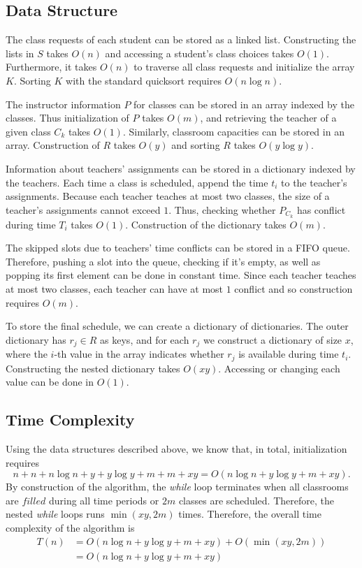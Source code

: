 \documentclass[11pt, oneside]{article}   	%
\begin{document}
\subsection{Data Structure}
The class requests of each student can be stored as a linked list. Constructing the lists in $S$ takes $O(n)$ and accessing a student's class choices takes $O(1)$. Furthermore, it takes $O(n)$ to traverse all class requests and initialize the array $K$. Sorting $K$ with the standard quicksort requires $O(n\log n)$.\par
The instructor information $P$ for classes can be stored in an array indexed by the classes. Thus initialization of $P$ takes $O(m)$, and retrieving the teacher of a given class $C_k$ takes $O(1)$. Similarly, classroom capacities can be stored in an array. Construction of $R$ takes $O(y)$ and sorting $R$ takes $O(y\log y)$.\par
Information about teachers' assignments can be stored in a dictionary indexed by the teachers. Each time a class is scheduled, append the time $t_i$ to the teacher's assignments. Because each teacher teaches at most two classes, the size of a teacher's assignments cannot exceed $1$. Thus, checking whether $P_{C_k}$ has conflict during time $T_i$ takes $O(1)$. Construction of the dictionary takes $O(m)$.\par
The skipped slots due to teachers' time conflicts can be stored in a FIFO queue. Therefore, pushing a slot into the queue, checking if it's empty, as well as popping its first element can be done in constant time. Since each teacher teaches at most two classes, each teacher can have at most $1$ conflict and so construction requires $O(m)$.\par
To store the final schedule, we can create a dictionary of dictionaries. The outer dictionary has $r_j\in R$ as keys, and for each $r_j$ we construct a dictionary of size $x$, where the $i$-th value in the array indicates whether $r_j$ is available during time $t_i$. Constructing the nested dictionary takes $O(xy)$. Accessing or changing each value can be done in $O(1)$.\par


\subsection{Time Complexity}
Using the data structures described above, we know that, in total, initialization requires \[n+n+n\log n+y+y\log y+m+m+xy = O(n\log n+y\log y+m +xy).\] By construction of the algorithm, the {\it while} loop terminates when all classrooms are $filled$ during all time periods or $2m$ classes are scheduled. Therefore, the nested {\it while} loops runs $\min(xy, 2m)$ times. Therefore, the overall time complexity of the algorithm is 
\begin{align*}
T(n) &= O(n\log n+y\log y+m +xy)+O(\min(xy, 2m))\\
& = O(n\log n+y\log y+m +xy)
\end{align*}
\end{document}
